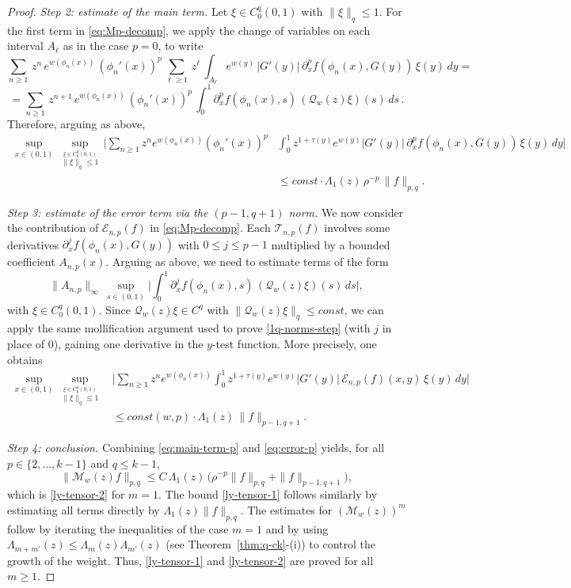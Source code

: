 \documentclass[11pt]{amsart}
\theoremstyle{definition}
\theoremstyle{remark}
\theoremstyle{definition}
\numberwithin{equation}{section}
\newcommand{\QQ}{\mathcal{Q}}
\newcommand{\MM}{\mathcal{M}}
\begin{document}
\begin{proof}
{\noindent
\emph{Step 2: estimate of the main term.} 
Let $\xi\in C_0^q(0,1)$ with $\|\xi\|_q\le 1$.
For the first term in \eqref{eq:Mp-decomp}, we apply the change of variables on each interval $A_\ell$ as in the case $p=0$, to write
\[
\sum_{n\ge 1}\, z^{n}\, e^{w(\phi_n(x))}\, (\phi_n'(x))^p\, \sum_{\ell \ge 1}\, z^\ell\,  \int_{A_\ell} e^{w(y)}\, |G'(y)|\, \partial_x^p f(\phi_n(x),G(y))\, \xi(y)\, dy =
\]
\[
=\sum_{n\ge 1}\, z^{n+1}\, e^{w(\phi_n(x))}\, (\phi_n'(x))^p\, \int_0^1 \partial_x^p f(\phi_n(x),s)\, (\QQ_w(z)\xi)(s)\, ds\, .
\]
Therefore, arguing as above,
\begin{equation}\label{eq:main-term-p}
\begin{split}
\sup_{x\in (0,1)}\, \sup_{\stackrel{\xi \in C^{q}_0(0,1)}{\|\xi\|_{q}\le1}}\,
\Big|\sum_{n\ge 1} z^n e^{w(\phi_n(x))} (\phi_n'(x))^p &
\int_0^1 z^{1+\tau(y)} e^{w(y)}|G'(y)|\, \partial_x^p f(\phi_n(x),G(y))\,\xi(y)\,dy\Big|\\
&\le const \cdot\Lambda_1(z)\,\rho^{-p}\,\|f\|_{p,q}.
\end{split}
\end{equation}

\noindent
\emph{Step 3: estimate of the error term via the $(p-1,q+1)$ norm.}
We now consider the contribution of $\mathcal{E}_{n,p}(f)$ in \eqref{eq:Mp-decomp}.
Each $\mathcal{T}_{n,p}(f)$ involves some derivatives $\partial_x^j f(\phi_n(x),G(y))$ with $0\le j\le p-1$ multiplied by a bounded coefficient $A_{n,p}(x)$. Arguing as above, we need to estimate terms of the form
\[
 \|A_{n,p}\|_\infty\, \sup_{s\in(0,1)}\Big|\int_0^1 \partial_x^j f(\phi_n(x),s)\, (\QQ_w(z)\xi)(s)\, ds\Big|,
\]
with $\xi \in C^q_0(0,1)$. Since $\QQ_w(z)\xi \in C^q$ with $\|\QQ_w(z)\xi \|_q\le const$, we can apply the same mollification argument used to prove \eqref{1q-norms-step} (with $j$ in place of $0$), gaining one derivative in the $y$-test function.
More precisely, one obtains
\begin{equation}\label{eq:error-p}
\begin{split}
\sup_{x\in (0,1)}\, \sup_{\stackrel{\xi \in C^{q}_0(0,1)}{\|\xi\|_{q}\le1}}\,
& \Big|\sum_{n\ge 1} z^n e^{w(\phi_n(x))}\int_0^1 z^{1+\tau(y)}e^{w(y)}|G'(y)|\, \mathcal{E}_{n,p}(f)(x,y)\,\xi(y)\,dy\Big|\\
&\le const(w,p)\cdot \Lambda_1(z)\,\|f\|_{p-1,q+1}.
\end{split}
\end{equation}

\smallskip\noindent
\emph{Step 4: conclusion.}
Combining \eqref{eq:main-term-p} and \eqref{eq:error-p} yields, for all $p\in\{2,\dots,k-1\}$ and $q\le k-1$,
\[
\|\MM_w(z) f\|_{p,q}\le C\,\Lambda_1(z)\,\big(\rho^{-p}\|f\|_{p,q}+\|f\|_{p-1,q+1}\big),
\]
which is \eqref{ly-tensor-2} for $m=1$. The bound \eqref{ly-tensor-1} follows similarly by estimating all terms directly by $\Lambda_1(z)\|f\|_{p,q}$.
The estimates for $(\MM_w(z))^m$ follow by iterating the inequalities of the case $m=1$ and by using
$\Lambda_{m+m'}(z)\le \Lambda_m(z)\Lambda_{m'}(z)$ (see Theorem~\ref{thm:q-ck}-(i)) to control the growth of the weight. Thus, \eqref{ly-tensor-1} and \eqref{ly-tensor-2} are proved for all $m\ge 1$.}
\end{proof}
\end{document}
